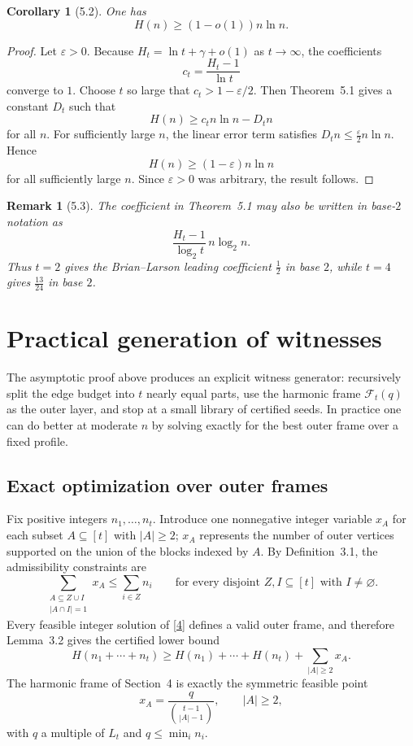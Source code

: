 \documentclass[11pt]{article}
\newtheorem{corollary}[theorem]{Corollary}
\newtheorem{remark}[theorem]{Remark}
\begin{document}
\begin{corollary}[5.2]
One has
\[
H(n) \ge (1-o(1)) n \ln n.
\]
\end{corollary}

\begin{proof}
Let $\varepsilon > 0$. Because $H_t = \ln t + \gamma + o(1)$ as $t \to \infty$, the coefficients
\[
c_t = \frac{H_t - 1}{\ln t}
\]
converge to $1$. Choose $t$ so large that $c_t > 1 - \varepsilon/2$. Then Theorem~5.1 gives a constant $D_t$ such that
\[
H(n) \ge c_t n \ln n - D_t n
\]
for all $n$. For sufficiently large $n$, the linear error term satisfies $D_t n \le \frac{\varepsilon}{2} n \ln n$. Hence
\[
H(n) \ge (1-\varepsilon)n \ln n
\]
for all sufficiently large $n$. Since $\varepsilon > 0$ was arbitrary, the result follows.
\end{proof}

\begin{remark}[5.3]
The coefficient in Theorem~5.1 may also be written in base-$2$ notation as
\[
\frac{H_t - 1}{\log_2 t}\, n \log_2 n.
\]
Thus $t=2$ gives the Brian--Larson leading coefficient $\frac12$ in base $2$, while $t=4$ gives $\frac{13}{24}$ in base $2$.
\end{remark}

\section{Practical generation of witnesses}

The asymptotic proof above produces an explicit witness generator: recursively split the edge budget into $t$ nearly equal parts, use the harmonic frame $\mathcal F_t(q)$ as the outer layer, and stop at a small library of certified seeds. In practice one can do better at moderate $n$ by solving exactly for the best outer frame over a fixed profile.

\subsection{Exact optimization over outer frames}

Fix positive integers $n_1,\dots,n_t$. Introduce one nonnegative integer variable $x_A$ for each subset $A \subseteq [t]$ with $|A| \ge 2$; $x_A$ represents the number of outer vertices supported on the union of the blocks indexed by $A$. By Definition~3.1, the admissibility constraints are
\begin{equation}
\sum_{\substack{A \subseteq Z \cup I \\ |A \cap I| = 1}} x_A \le \sum_{i \in Z} n_i
\qquad \text{for every disjoint } Z,I \subseteq [t] \text{ with } I \neq \varnothing. \tag{4}
\end{equation}
Every feasible integer solution of \eqref{4} defines a valid outer frame, and therefore Lemma~3.2 gives the certified lower bound
\[
H(n_1 + \cdots + n_t) \ge H(n_1) + \cdots + H(n_t) + \sum_{|A| \ge 2} x_A.
\]
The harmonic frame of Section~4 is exactly the symmetric feasible point
\[
x_A = \frac{q}{\binom{t-1}{|A|-1}}, \qquad |A| \ge 2,
\]
with $q$ a multiple of $L_t$ and $q \le \min_i n_i$.
\end{document}
